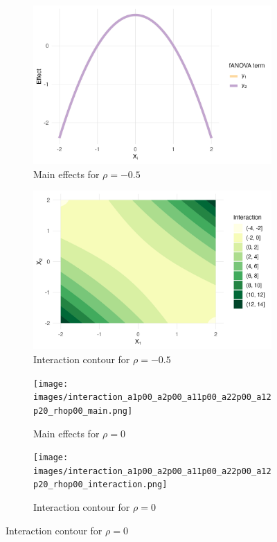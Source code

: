 \begin{figure}[htpb]
    \centering
    \begin{subfigure}[t]{0.49\textwidth}
        \centering
        \includegraphics[width=\textwidth]{images/experiment_section/interaction_a1p00_a2p00_a11p00_a22p00_a12p20_rhom05_main.png}
        \caption{Main effects for $\rho = -0.5$}
    \end{subfigure}%
    \hfill
    \begin{subfigure}[t]{0.49\textwidth}
        \centering
        \includegraphics[width=\textwidth]{images/experiment_section/interaction_a1p00_a2p00_a11p00_a22p00_a12p20_rhom05_interaction.png}
        \caption{Interaction contour for $\rho = -0.5$}
    \end{subfigure}

    \vspace{0.5em}
    \begin{subfigure}[t]{0.49\textwidth}
        \centering
        \texttt{[image: images/interaction\_a1p00\_a2p00\_a11p00\_a22p00\_a12p20\_rhop00\_main.png]}
        \caption{Main effects for $\rho = 0$}
    \end{subfigure}%
    \hfill
    \begin{subfigure}[t]{0.49\textwidth}
        \centering
        \texttt{[image: images/interaction\_a1p00\_a2p00\_a11p00\_a22p00\_a12p20\_rhop00\_interaction.png]}
        \caption{Interaction contour for $\rho = 0$}
    \end{subfigure}


\end{figure}
